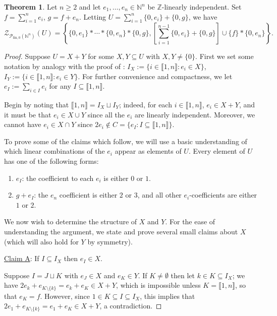 \documentclass{report}
\newcommand{\NN}{\mathbb{N}}
\renewcommand{\P}{\mathcal{P}}
\newcommand{\ZZ}{\mathbb{Z}}
\newcommand{\Z}{\mathcal{Z}}
\newcommand{\llb}{\llbracket}
\newcommand{\rrb}{\rrbracket}
\newcommand{\fon}{{\textrm{fin}, 0}}
\renewcommand{\:}{\text{:}}
\theoremstyle{definition}
\newtheorem{thm}[defn]{Theorem}
\begin{document}
\begin{thm} \label{thm:2n-length-set}
Let $n\ge 2$ and let $e_1,\dots, e_n\in \NN^n$ be $\ZZ$-linearly independent.
Set $f = \sum_{i=1}^n e_i$, $g=f+e_n$.
Letting $U = \sum_{i=1}^n \{0,e_i\} + \{0,g\}$, we have 
\[\Z_{\P_\fon(\NN^n)}(U) = \left\{ \{0,e_1\}*\cdots*\{0,e_n\}*\{0,g\}, \left[\sum_{i=1}^{n-1}\{0,e_i\}+\{0,g\}\right]\cup\{f\} * \{0,e_n\} \right\}. \]
\end{thm}

\begin{proof}
Suppose $U = X + Y$ for some $X,Y\subseteq U$ with $X,Y\neq \{0\}$.
First we set some notation by analogy with the proof of \cite[Theorem 4.10]{fan-tringali18}: $I_X := \{i\in \llb 1,n \rrb: e_i\in X\}$, $I_Y := \{i\in \llb1,n \rrb: e_i\in Y \}$.
For further convenience and compactness, we let $e_I := \sum_{i\in I}e_i$ for any $I\subseteq \llb 1,n \rrb$.

Begin by noting that $\llb 1,n \rrb = I_X \sqcup I_Y$; indeed, for each $i\in\llb 1,n \rrb$, $e_i\in X+Y$, and it must be that $e_i\in X\cup Y$ since all the $e_i$ are linearly independent.  
Moreover, we cannot have $e_i\in X\cap Y$ since $2e_i \notin C = \{e_I : I\subseteq \llb 1,n \rrb \}$.

To prove some of the claims which follow, we will use a basic understanding of which linear combinations of the $e_i$ appear as elements of $U$.
Every element of $U$ has one of the following forms:
\begin{enumerate}[(F1)]
\item $e_I$: the coefficient to each $e_i$ is either $0$ or $1$.
\item $g+e_I$: the $e_n$ coefficient is either $2$ or $3$, and all other $e_i$-coefficients are either $1$ or $2$.
\end{enumerate}

We now wish to determine the structure of $X$ and $Y$.
For the ease of understanding the argument, we state and prove several small claims about $X$ (which will also hold for $Y$ by symmetry).

\noindent\underline{Claim A}: If $I\subseteq I_X$ then $e_I\in X$. 

Suppose $I = J\sqcup K$ with $e_J\in X$ and $e_K\in Y$.
If $K\neq \emptyset$ then let $k\in K\subseteq I_X$; we have $2e_k + e_{K\setminus\{k\}} = e_k + e_K\in X+Y$, which is impossible unless $K = \llb 1,n\rrb$, so that $e_K = f$.
However, since $1\in K\subseteq I\subseteq I_X$, this implies that $2e_1 + e_{K\setminus\{k\}} = e_1 + e_K\in X+Y$, a contradiction.


\end{proof}
\end{document}
